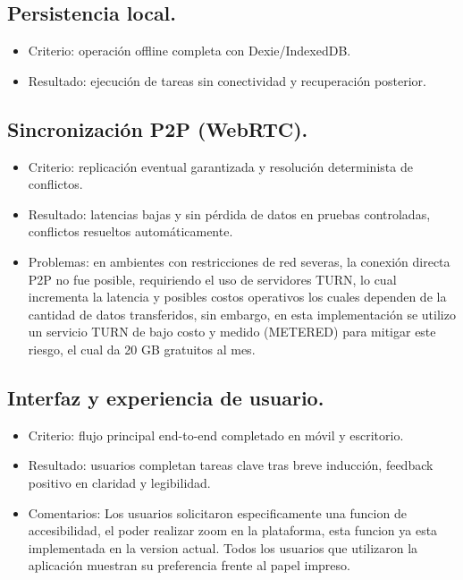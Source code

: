 \documentclass[10pt,a4paper]{report}
\begin{document}
\subsection*{Persistencia local.}
\begin{itemize}
    \item Criterio: operaci\'on offline completa con Dexie/IndexedDB.
    \item Resultado: ejecuci\'on de tareas sin conectividad y recuperaci\'on posterior.
\end{itemize}

\subsection*{Sincronizaci\'on P2P (WebRTC).}
\begin{itemize}
    \item Criterio: replicaci\'on eventual garantizada y resoluci\'on determinista de conflictos.
    \item Resultado: latencias bajas y sin p\'erdida de datos en pruebas controladas, conflictos resueltos autom\'aticamente.
    \item Problemas: en ambientes con restricciones de red severas, la conexi\'on directa P2P no fue posible, requiriendo el uso de servidores TURN, lo cual incrementa la latencia y posibles costos operativos los cuales dependen de la cantidad de datos transferidos, sin embargo, en esta implementación se utilizo un servicio TURN de bajo costo y medido (METERED) para mitigar este riesgo, el cual da 20 GB gratuitos al mes.
\end{itemize}

\subsection*{Interfaz y experiencia de usuario.}
\begin{itemize}
    \item Criterio: flujo principal end-to-end completado en m\'ovil y escritorio.
    \item Resultado: usuarios completan tareas clave tras breve inducci\'on, feedback positivo en claridad y legibilidad.
    \item Comentarios: Los usuarios solicitaron especificamente una funcion de accesibilidad, el poder realizar zoom en la plataforma, esta funcion ya esta implementada en la version actual. Todos los usuarios que utilizaron la aplicación muestran su preferencia frente al papel impreso.
\end{itemize}
\end{document}
